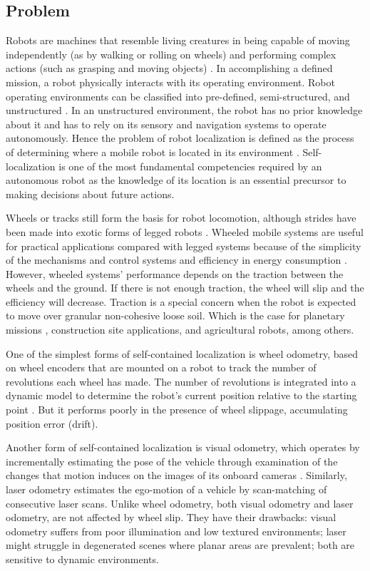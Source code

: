 \subsection{Problem} \label{subsec:problem}

Robots are machines that resemble living creatures in being capable of moving
independently (as by walking or rolling on wheels) and performing complex
actions (such as grasping and moving objects) \cite{WebsterRobot}. In
accomplishing a defined mission, a robot physically interacts with its
operating environment. Robot operating environments can be classified into
pre-defined, semi-structured, and unstructured \cite{Chen09}. In an
unstructured environment, the robot has no prior knowledge about it and has to
rely on its sensory and navigation systems to operate autonomously. Hence the
problem of robot localization is defined as the process of determining where a
mobile robot is located in its environment \cite{Localization2016}.
Self-localization is one of the most fundamental competencies required by an
autonomous robot as the knowledge of its location is an essential precursor to
making decisions about future actions.

Wheels or tracks still form the basis for robot locomotion, although strides
have been made into exotic forms of legged robots \cite{Sanchez09}. Wheeled
mobile systems are useful for practical applications compared with legged
systems because of the simplicity of the mechanisms and control systems and
efficiency in energy consumption \cite{Masayoshi2006}. However, wheeled
systems' performance depends on the traction between the wheels and the ground.
If there is not enough traction, the wheel will slip and the efficiency will
decrease. Traction is a special concern when the robot is expected to move over
granular non-cohesive loose soil. Which is the case for planetary missions
\cite{Amar2007}, construction site applications, and agricultural robots, among
others.

One of the simplest forms of self-contained localization is wheel odometry,
based on wheel encoders that are mounted on a robot to track the number of
revolutions each wheel has made. The number of revolutions is integrated into a
dynamic model to determine the robot's current position relative to the
starting point \cite{OdometrySurvey}. But it performs poorly in the presence of
wheel slippage, accumulating position error (drift).

Another form of self-contained localization is visual odometry, which operates
by incrementally estimating the pose of the vehicle through examination of the
changes that motion induces on the images of its onboard cameras
\cite{ScaramuzzaTutorial}. Similarly, laser odometry estimates the ego-motion
of a vehicle by scan-matching of consecutive laser scans. Unlike wheel
odometry, both visual odometry and laser odometry, are not affected by wheel
slip. They have their drawbacks: visual odometry suffers from poor illumination
and low textured environments; laser might struggle in degenerated scenes where
planar areas are prevalent; both are sensitive to dynamic environments.

